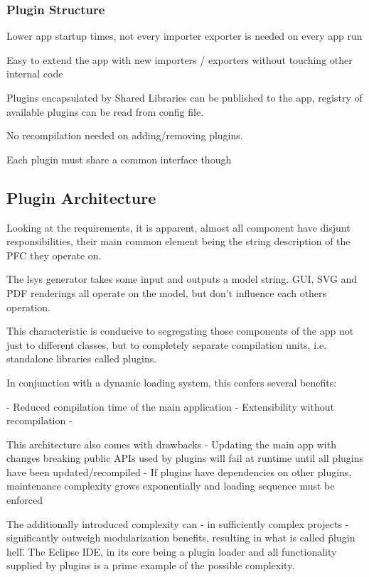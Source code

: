\subsubsection{Plugin Structure}
Lower app startup times, not every importer exporter is needed on every app run

Easy to extend the app with new importers / exporters without touching other internal code

Plugins encapsulated by Shared Libraries can be published to the app, registry of available plugins can be read from config file.

No recompilation needed on adding/removing plugins.

Each plugin must share a common interface though

\subsection{Plugin Architecture}
Looking at the requirements, it is apparent, almost all component have disjunt responsibilities, their main common element being the string description of the PFC they operate on.

The \gls{lsys} generator takes some input and outputs a model string. GUI, SVG and PDF renderings all operate on the model, but don't influence each others operation.

This characteristic is conducive to segregating those components of the app not just to different classes, but to completely separate compilation units, i.e. standalone libraries called plugins.

In conjunction with a dynamic loading system, this confers several benefits:

- Reduced compilation time of the main application
- Extensibility without recompilation
- 

This architecture also comes with drawbacks
- Updating the main app with changes breaking public APIs used by plugins will fail at runtime until all plugins have been updated/recompiled
- If plugins have dependencies on other plugins, maintenance complexity grows exponentially and loading sequence must be enforced

The additionally introduced complexity can - in sufficiently complex projects - significantly outweigh modularization benefits, resulting in what is called \"plugin hell\". %
The Eclipse IDE, in its core being a plugin loader and all functionality supplied by plugins is a prime example of the possible complexity.


